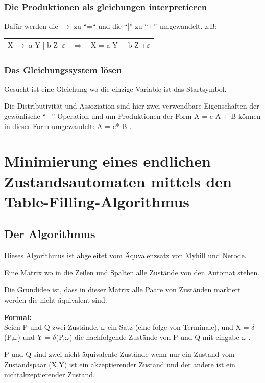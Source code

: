 \subsubsection{Die Produktionen als gleichungen interpretieren}

Dafür werden die $\rightarrow$ zu ``=``  und die ``|'' zu ``+'' umgewandelt.
z.B:

\begin{tabular}{lcr}

X $\rightarrow$ a Y | b Z |$\varepsilon$ & $\Longrightarrow$ & X = a Y + b Z
+$\varepsilon$\\

 
\end{tabular}

\subsubsection{Das Gleichungssystem lösen}

Gesucht ist eine Gleichung wo die einzige Variable ist das Startsymbol.

Die Distributivität und Assoziation sind hier zwei verwendbare Eigenschaften der
gewönlische ``+'' Operation und um Produktionen der Form A = c A + B können in
dieser Form umgewandelt: A = c* B .


\section{Minimierung eines endlichen Zustandsautomaten mittels den
Table-Filling-Algorithmus}

\subsection{Der Algorithmus}
Dieses Algorithmus ist abgeleitet vom Äquvalenzsatz von Myhill und Nerode. 

Eine Matrix wo in die Zeilen und Spalten alle Zustände von den Automat stehen.

Die Grundidee ist, dass in dieser Matrix alle Paare von Zuständen markiert
werden die nicht äquivalent sind.

{\bf Formal: \\}
Seien P und Q zwei Zustände, $\omega$ ein Satz (eine folge von Terminale), und X
= $\delta$(P,$\omega$) und Y = $\delta$(P,$\omega$) die nachfolgende Zustände von P und Q mit eingabe
$\omega$ .

P und Q sind zwei nicht-äquivalente Zustände wenn nur ein Zustand vom
Zustandspaar (X,Y) ist ein akzeptierender Zustand und der andere ist ein
nichtakzeptierender Zustand.

